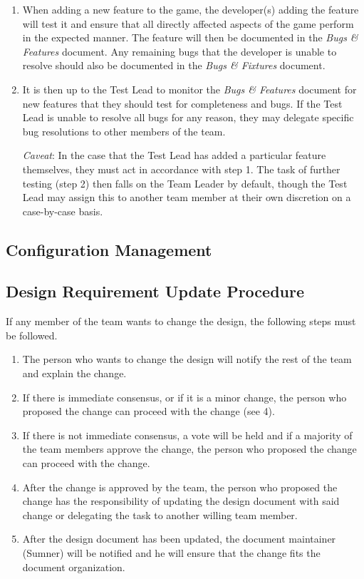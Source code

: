 \documentclass[12pt,titlepage]{article}
\begin{document}
\begin{enumerate}
\item When adding a new feature to the game, the developer(s) adding the feature
      will test it and ensure that all directly affected aspects of the game
      perform in the expected manner. The feature will then be documented in the
      {\it Bugs \& Features} document. Any remaining bugs that the developer is
      unable to resolve should also be documented in the {\it Bugs \& Fixtures}
      document.
\item It is then up to the Test Lead to monitor the {\it Bugs \& Features}
      document for new features that they should test for completeness and bugs.
      If the Test Lead is unable to resolve all bugs for any reason, they may
      delegate specific bug resolutions to other members of the team.

      {\it Caveat}: In the case that the Test Lead has added a particular
      feature themselves, they must act in accordance with step 1. The task of
      further testing (step 2) then falls on the Team Leader by default, though
      the Test Lead may assign this to another team member at their own
      discretion on a case-by-case basis.
\end{enumerate}

\subsection{Configuration Management}

\subsection{Design Requirement Update Procedure}

If any member of the team wants to change the design, the following steps must
be followed.

\begin{enumerate}
    \item The person who wants to change the design will notify the rest of the
        team and explain the change.

    \item If there is immediate consensus, or if it is a minor change, the
        person who proposed the change can proceed with the change (see 4).

    \item If there is not immediate consensus, a vote will be held and if a
        majority of the team members approve the change, the person who proposed
        the change can proceed with the change.

    \item After the change is approved by the team, the person who proposed the
        change has the responsibility of updating the design document with said
        change or delegating the task to another willing team member.

    \item After the design document has been updated, the document maintainer
        (Sumner) will be notified and he will ensure that the change fits the
        document organization.
\end{enumerate}
\end{document}
